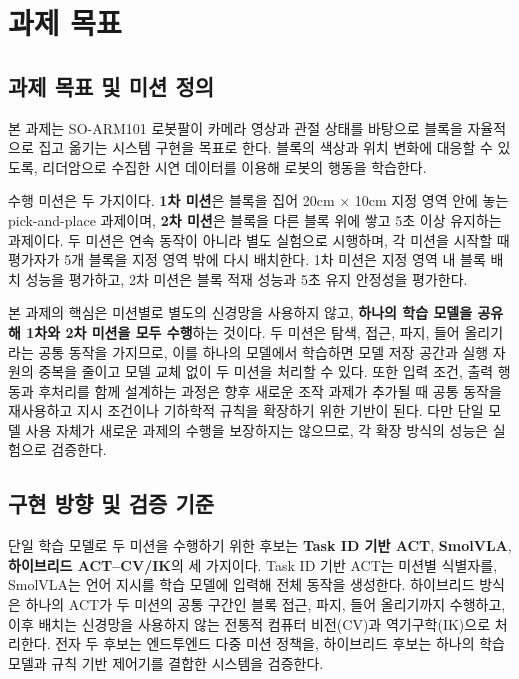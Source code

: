 \documentclass[titlepage]{pnureport}
\begin{document}
\maketitle

\tableofcontents
\clearpage
{}

\chapter{과제 목표}

\section{과제 목표 및 미션 정의}

본 과제는 SO-ARM101 로봇팔이 카메라 영상과 관절 상태를 바탕으로 블록을 자율적으로 집고 옮기는 시스템 구현을 목표로 한다. 블록의 색상과 위치 변화에 대응할 수 있도록, 리더암으로 수집한 시연 데이터를 이용해 로봇의 행동을 학습한다\cite{zhao2023act,lerobot}.

수행 미션은 두 가지이다. \textbf{1차 미션}은 블록을 집어 20cm $\times$ 10cm 지정 영역 안에 놓는 pick-and-place 과제이며, \textbf{2차 미션}은 블록을 다른 블록 위에 쌓고 5초 이상 유지하는 과제이다. 두 미션은 연속 동작이 아니라 별도 실험으로 시행하며, 각 미션을 시작할 때 평가자가 5개 블록을 지정 영역 밖에 다시 배치한다. 1차 미션은 지정 영역 내 블록 배치 성능을 평가하고, 2차 미션은 블록 적재 성능과 5초 유지 안정성을 평가한다.

본 과제의 핵심은 미션별로 별도의 신경망을 사용하지 않고, \textbf{하나의 학습 모델을 공유해 1차와 2차 미션을 모두 수행}하는 것이다. 두 미션은 탐색, 접근, 파지, 들어 올리기라는 공통 동작을 가지므로, 이를 하나의 모델에서 학습하면 모델 저장 공간과 실행 자원의 중복을 줄이고 모델 교체 없이 두 미션을 처리할 수 있다. 또한 입력 조건, 출력 행동과 후처리를 함께 설계하는 과정은 향후 새로운 조작 과제가 추가될 때 공통 동작을 재사용하고 지시 조건이나 기하학적 규칙을 확장하기 위한 기반이 된다. 다만 단일 모델 사용 자체가 새로운 과제의 수행을 보장하지는 않으므로, 각 확장 방식의 성능은 실험으로 검증한다.

\section{구현 방향 및 검증 기준}

단일 학습 모델로 두 미션을 수행하기 위한 후보는 \textbf{Task ID 기반 ACT}, \textbf{SmolVLA}, \textbf{하이브리드 ACT--CV/IK}의 세 가지이다. Task ID 기반 ACT는 미션별 식별자를, SmolVLA는 언어 지시를 학습 모델에 입력해 전체 동작을 생성한다. 하이브리드 방식은 하나의 ACT가 두 미션의 공통 구간인 블록 접근, 파지, 들어 올리기까지 수행하고, 이후 배치는 신경망을 사용하지 않는 전통적 컴퓨터 비전(CV)과 역기구학(IK)으로 처리한다. 전자 두 후보는 엔드투엔드 다중 미션 정책을, 하이브리드 후보는 하나의 학습 모델과 규칙 기반 제어기를 결합한 시스템을 검증한다.
\end{document}
